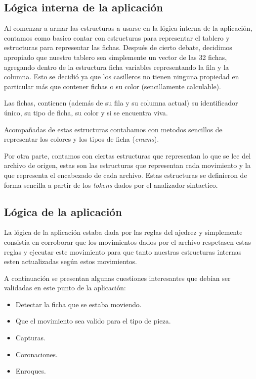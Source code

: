 \documentclass[a4paper,10pt]{article}
\begin{document}
\subsection{Lógica interna de la aplicación }

Al comenzar a armar las estructuras a usarse en la lógica interna de la aplicación, contamos como basico contar con estructuras
para representar el tablero y estructuras para representar las fichas. Después de cierto debate, decidimos apropiado que nuestro
tablero sea simplemente un vector de las 32 fichas, agregando dentro de la estructura ficha variables representando la fila y la 
columna. Esto se decidió ya que los casilleros no tienen ninguna propiedad en particular más que contener fichas o su color 
(sencillamente calculable).

Las fichas, contienen (además de su fila y su columna actual) su identificador único, su tipo de ficha, su color y si se encuentra 
viva.

Acompañadas de estas estructuras contabamos con metodos sencillos de representar los colores y los tipos de ficha (\textit{enums}).

Por otra parte, contamos con ciertas estructuras que representan lo que se lee del archivo de origen, estas son las estructuras que 
representan cada movimiento y la que representa el encabezado de cada archivo. Estas estructuras se definieron de forma sencilla a 
partir de los \textit{tokens} dados por el analizador sintactico.


\subsection{Lógica de la aplicación}

La lógica de la aplicación estaba dada por las reglas del ajedrez y simplemente consistía en corroborar que los movimientos dados
por el archivo respetasen estas reglas y ejecutar este movimiento para que tanto nuestras estructuras internas esten actualizadas 
según estos movimientos.

A continuación se presentan algunas cuestiones interesantes que debían ser validadas en este punto de la aplicación:
\begin{itemize}
 \item Detectar la ficha que se estaba moviendo.
 \item Que el movimiento sea valido para el tipo de pieza.
 \item Capturas.
 \item Coronaciones.
 \item Enroques.
\end{itemize}
\end{document}
